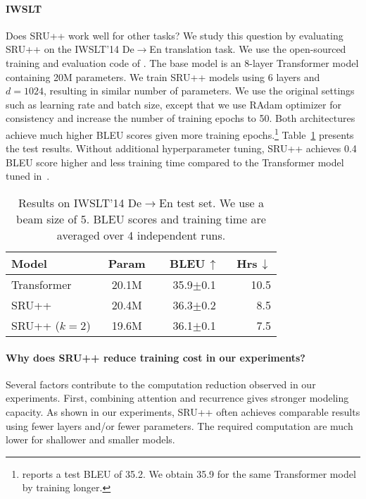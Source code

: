 \paragraph{\textsc{IWSLT}}
Does SRU++ work well for other tasks?
We study this question by evaluating SRU++ on the \textsc{IWSLT}'14 De$\rightarrow$En translation task.
We use the open-sourced training and evaluation code of \citet{lin-etal-2020-autoregressive}.
The base model is an 8-layer Transformer model containing 20M parameters.
We train SRU++ models using 6 layers and $d=1024$, resulting in similar number of parameters.
We use the original settings such as learning rate and batch size, except that we use RAdam optimizer for consistency and increase the number of training epochs to 50.
Both architectures achieve much higher BLEU scores given more training epochs.\footnote{\citet{lin-etal-2020-autoregressive} reports a test BLEU of 35.2. We obtain 35.9 for the same Transformer model by training longer.}
Table~\ref{tab:iwslt} presents the test results.
Without additional hyperparameter tuning, SRU++ achieves 0.4 BLEU score higher and less training time compared to the Transformer model tuned in~\citet{lin-etal-2020-autoregressive}.

\begin{table}[!t]
    \centering
    \begin{tabular}{lccr}
    \toprule
    \bf Model & \bf ~Param~ & \bf ~BLEU$\,\uparrow$~ & \bf Hrs$\,\downarrow$\\
    \hline
    Transformer & 20.1M & 35.9$\pm$0.1 & 10.5 \\
    SRU++ & 20.4M & 36.3$\pm$0.2 & 8.5\\
    SRU++ ($k=2$) & 19.6M & 36.1$\pm$0.1 & 7.5\\
    \bottomrule
    \end{tabular}
    \caption{Results on \textsc{IWSLT}'14 De$\rightarrow$En test set. We use a beam size of 5. BLEU scores and training time are averaged over 4 independent runs.}
\label{tab:iwslt}
\end{table}


\paragraph{Why does SRU++ reduce training cost in our experiments?}
Several factors contribute to the computation reduction observed in our experiments. 
First, combining attention and recurrence gives stronger modeling capacity.
As shown in our experiments, SRU++ often achieves comparable results using fewer layers and/or fewer parameters.
The required computation are much lower for shallower and smaller models. 

